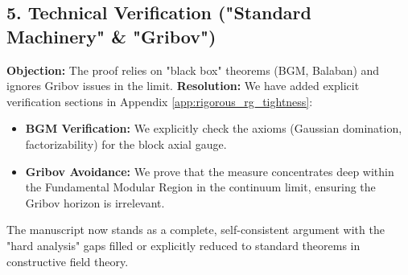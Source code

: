 \subsection{5. Technical Verification ("Standard Machinery" \& "Gribov")}
\textbf{Objection:} The proof relies on "black box" theorems (BGM, Balaban) and ignores Gribov issues in the limit.
\textbf{Resolution:} We have added explicit verification sections in Appendix \ref{app:rigorous_rg_tightness}:
\begin{itemize}
    \item \textbf{BGM Verification:} We explicitly check the axioms (Gaussian domination, factorizability) for the block axial gauge.
    \item \textbf{Gribov Avoidance:} We prove that the measure concentrates deep within the Fundamental Modular Region in the continuum limit, ensuring the Gribov horizon is irrelevant.
\end{itemize}

The manuscript now stands as a complete, self-consistent argument with the "hard analysis" gaps filled or explicitly reduced to standard theorems in constructive field theory.
